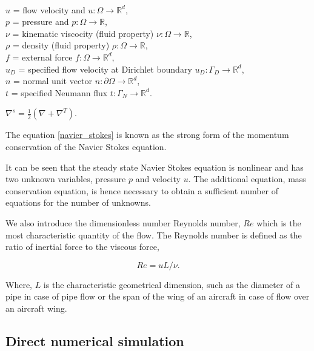 \documentclass[a4paper,twoside,openright]{book}
\begin{document}
$ $\\
$u$ = flow velocity and $u:\Omega \rightarrow \mathbb{R}^d$,\\
$p$ = pressure and $p:\Omega \rightarrow \mathbb{R}$,\\
$\nu$ = kinematic viscocity (fluid property) $\nu:\Omega \rightarrow \mathbb{R}$,\\ 
$\rho$ = density (fluid property) $\rho:\Omega \rightarrow \mathbb{R}$,\\
$f$ = external force $f:\Omega \rightarrow \mathbb{R}^d$,\\
$u_D$ = specified flow velocity at Dirichlet boundary $u_D:\Gamma_D \rightarrow \mathbb{R}^d$,\\
$n$ = normal unit vector $n:\partial \Omega \rightarrow \mathbb{R}^d$,\\
$t$ = specified Neumann flux $t:\Gamma_N \rightarrow \mathbb{R}^d$.\\

\begin{center}
$\nabla^s = \frac{1}{2}(\nabla + \nabla^T) \textrm{.}$
\end{center}

The equation \eqref{navier_stokes} is known as the strong form of the momentum conservation of the Navier Stokes equation.

It can be seen that the steady state Navier Stokes equation is nonlinear and has two unknown variables, pressure $p$ and velocity $u$. The additional equation, mass conservation equation, is hence necessary to obtain a sufficient number of equations for the number of unknowns.

We also introduce the dimensionless number Reynolds number, $Re$ which is the most characteristic quantity of the flow. The Reynolds number is defined as the ratio of inertial force to the viscous force,

\begin{equation} \label{reynolds_number}
Re =  u L / \nu \textrm{.}
\end{equation}

Where, $L$ is the characteristic geometrical dimension, such as the diameter of a pipe in case of pipe flow or the span of the wing of an aircraft in case of flow over an aircraft wing.\\

\subsection[DNS]{Direct numerical simulation} 
\end{document}
